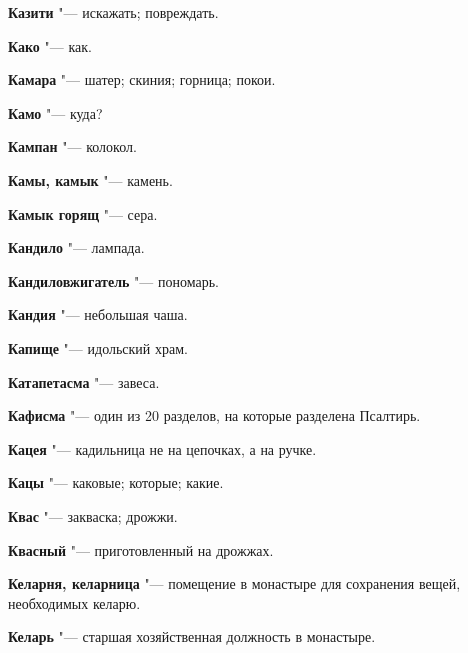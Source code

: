 \begin{mymulticols}{2}
\noindent\textbf{Казити} "--- искажать; повреждать. 




\noindent\textbf{Како} "--- как. 




\noindent\textbf{Камара} "--- шатер; скиния; горница; покои. 




\noindent\textbf{Камо} "--- куда? 




\noindent\textbf{Кампан} "--- колокол. 




\noindent\textbf{Камы, камык} "--- камень. 




\noindent\textbf{Камык горящ} "--- сера. 




\noindent\textbf{Кандило} "--- лампада. 




\noindent\textbf{Кандиловжигатель} "--- пономарь. 




\noindent\textbf{Кандия} "--- небольшая чаша. 




\noindent\textbf{Капище} "--- идольский храм. 




\noindent\textbf{Катапетасма} "--- завеса. 




\noindent\textbf{Кафисма} "--- один из 20 разделов, на которые разделена Псалтирь. 




\noindent\textbf{Кацея} "--- кадильница не на цепочках, а на ручке. 




\noindent\textbf{Кацы} "--- каковые; которые; какие. 




\noindent\textbf{Квас} "--- закваска; дрожжи. 




\noindent\textbf{Квасный} "--- приготовленный на дрожжах. 




\noindent\textbf{Келарня, келарница} "--- помещение в монастыре для сохранения вещей, необходимых келарю. 




\noindent\textbf{Келарь} "--- старшая хозяйственная должность в монастыре. 





\end{mymulticols}
